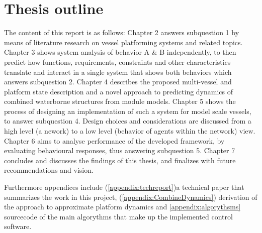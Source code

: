 \section{Thesis outline}
The content of this report is as follows:
Chapter 2 answers subquestion 1 by means of literature research on vessel platforming systems and related topics. 
Chapter 3 shows system analysis of behavior A \& B independently, to then predict how functions, requirements, constraints and other characteristics translate and interact in a single system that shows both behaviors which answers subquestion 2.
Chapter 4 describes the proposed multi-vessel and platform state description and a novel approach to predicting dynamics of combined waterborne structures from module models.
Chapter 5 shows the process of designing an implementation of such a system for model scale vessels, to answer subquestion 4. Design choices and considerations are discussed from a high level (a nework) to a low level (behavior of agents within the network) view. 
Chapter 6 aims to analyse performance of the developed framework, by evaluating behavioural responses, thus answering subquestion 5.
Chapter 7 concludes and discusses the findings of this thesis, and finalizes with future recommendations and vision.

Furthermore appendices include (\ref{appendix:techreport})a technical paper that summarizes the work in this project, (\ref{appendix:CombineDynamics}) derivation of the approach to approximate platform dynamics and \ref{appendix:algorythsms} sourcecode of the main algorythms that make up the implemented control software. 